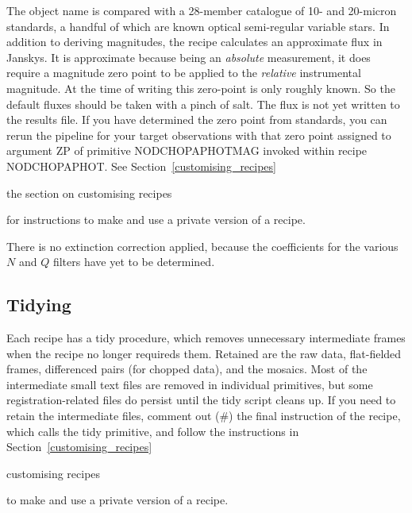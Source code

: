 \documentclass[twoside,11pt]{article}
\newcommand{\htmlref}[2]{#1}
\newenvironment{latexonly}{}{}
\newcommand{\xlabel}[1]{}
\renewcommand{\_}{\texttt{\symbol{95}}}
\begin{document}
The object name is compared with a 28-member catalogue of 10- and
20-micron standards, a handful of which are known optical semi-regular
variable stars.  In addition to deriving magnitudes, the recipe
calculates an approximate flux in Janskys.  It is approximate because
being an {\em absolute} measurement, it does require a magnitude zero
point to be applied to the {\em relative} instrumental magnitude. At
the time of writing this zero-point is only roughly known.  So the
default fluxes should be taken with a pinch of salt.  The flux is not
yet written to the results file.  If you have determined the zero
point from standards, you can rerun the pipeline for your target
observations with that zero point assigned to argument ZP of
primitive \_NOD\_CHOP\_APHOT\_MAG\_ invoked within recipe
NOD\_CHOP\_APHOT.  See
\begin{latexonly}
Section~\ref{customising_recipes}
\end{latexonly}
\begin{htmlonly}
the section on 
\htmlref{customising recipes}{customising_recipes}
\end{htmlonly}
for instructions to make and use a private version of a recipe.

There is no extinction correction applied, because the coefficients for the
various $N$ and $Q$ filters have yet to be determined.

\subsection{\xlabel{tidying}Tidying\label{tidying}}

Each recipe has a tidy procedure, which removes unnecessary
intermediate frames when the recipe no longer requireds them.  Retained
are the raw data, flat-fielded frames, differenced pairs (for chopped
data), and the mosaics.  Most of the intermediate small text files are
removed in individual primitives, but some registration-related files
do persist until the tidy script cleans up.  If you need to retain the
intermediate files, comment out (\#) the final instruction of the recipe,
which calls the tidy primitive, and follow the instructions in
\begin{latexonly}
Section~\ref{customising_recipes}
\end{latexonly}
\begin{htmlonly}
\htmlref{customising recipes}{customising_recipes}
\end{htmlonly}
to make and use a private version of a recipe.
\end{document}
